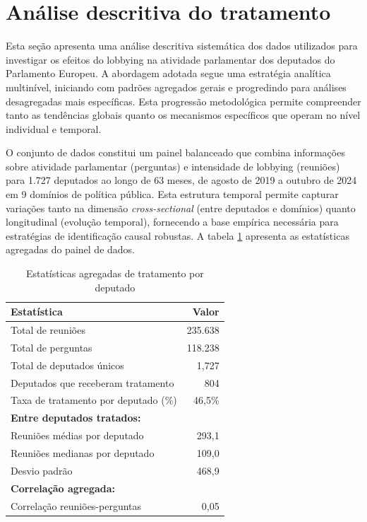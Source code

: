 \section{Análise descritiva do tratamento}
\label{sec:resultados_descritica}

Esta seção apresenta uma análise descritiva sistemática dos dados utilizados para investigar os efeitos do lobbying na atividade parlamentar dos deputados do Parlamento Europeu. A abordagem adotada segue uma estratégia analítica multinível, iniciando com padrões agregados gerais e progredindo para análises desagregadas mais específicas. Esta progressão metodológica permite compreender tanto as tendências globais quanto os mecanismos específicos que operam no nível individual e temporal.

O conjunto de dados constitui um painel balanceado que combina informações sobre atividade parlamentar (perguntas) e intensidade de lobbying (reuniões) para 1.727 deputados ao longo de 63 meses, de agosto de 2019 a outubro de 2024 em 9 domínios de política pública. Esta estrutura temporal permite capturar variações tanto na dimensão \textit{cross-sectional} (entre deputados e domínios) quanto longitudinal (evolução temporal), fornecendo a base empírica necessária para estratégias de identificação causal robustas. A tabela \ref{tab:mep_treatment_stats} apresenta as estatísticas agregadas do painel de dados.

\begin{table}[htbp]
    \centering
    \caption{Estatísticas agregadas de tratamento por deputado}
    \label{tab:mep_treatment_stats}
    \begin{tabular}{lr}
    \toprule
    \textbf{Estatística} & \textbf{Valor} \\
    \midrule
    Total de reuniões & 235.638 \\
    Total de perguntas & 118.238 \\
    Total de deputados únicos & 1{,}727 \\
    Deputados que receberam tratamento & 804 \\
    Taxa de tratamento por deputado (\%) & 46{,}5\% \\
    \midrule
    \textbf{Entre deputados tratados:} & \\
    Reuniões médias por deputado & 293{,}1 \\
    Reuniões medianas por deputado & 109{,}0 \\
    Desvio padrão & 468{,}9 \\
    \midrule
    \textbf{Correlação agregada:} & \\
    Correlação reuniões-perguntas & 0{,}05 \\
    \bottomrule
    \end{tabular}
\end{table}

